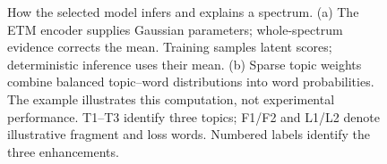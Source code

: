\begin{figure}[H]
\caption{How the selected model infers and explains a spectrum. (a) The ETM
encoder supplies Gaussian parameters; whole-spectrum evidence corrects the
mean. Training samples latent scores; deterministic inference uses their mean.
(b) Sparse topic weights combine balanced topic--word distributions into word
probabilities. The example illustrates this computation, not experimental
performance. T1--T3 identify three topics; F1/F2 and L1/L2 denote illustrative
fragment and loss words.
Numbered labels identify the three enhancements.}
\label{fig:model}
\end{figure}
